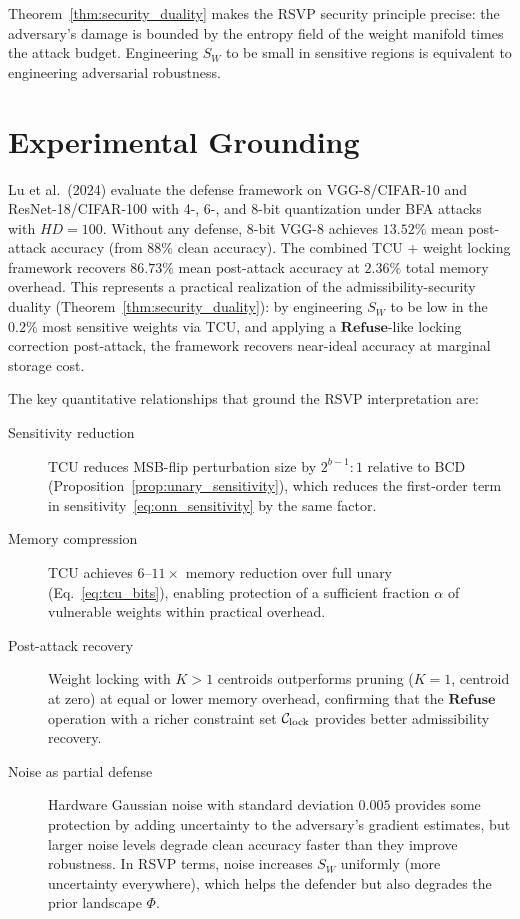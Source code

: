 \documentclass[11pt, openright, twoside]{book}
\theoremstyle{plain}
\theoremstyle{definition}
\theoremstyle{remark}
\newcommand{\Sfield}{S}
\newcommand{\Refuse}{\mathbf{Refuse}}
\begin{document}
Theorem~\ref{thm:security_duality} makes the RSVP security principle precise: the
adversary's damage is bounded by the entropy field of the weight manifold times the
attack budget. Engineering $\Sfield_W$ to be small in sensitive regions is equivalent
to engineering adversarial robustness.

\section{Experimental Grounding}

Lu et al.\ (2024) evaluate the defense framework on VGG-8/CIFAR-10 and ResNet-18/CIFAR-100
with 4-, 6-, and 8-bit quantization under BFA attacks with $HD=100$. Without any defense,
8-bit VGG-8 achieves $13.52\%$ mean post-attack accuracy (from $88\%$ clean accuracy).
The combined TCU + weight locking framework recovers $86.73\%$ mean post-attack accuracy
at $2.36\%$ total memory overhead. This represents a practical realization of the
admissibility-security duality (Theorem~\ref{thm:security_duality}): by engineering
$\Sfield_W$ to be low in the $0.2\%$ most sensitive weights via TCU, and applying
a $\Refuse$-like locking correction post-attack, the framework recovers near-ideal
accuracy at marginal storage cost.

The key quantitative relationships that ground the RSVP interpretation are:

\begin{description}
\item[Sensitivity reduction] TCU reduces MSB-flip perturbation size by $2^{b-1}:1$
  relative to BCD (Proposition~\ref{prop:unary_sensitivity}), which reduces the first-order
  term in sensitivity~\eqref{eq:onn_sensitivity} by the same factor.

\item[Memory compression] TCU achieves $6$--$11\times$ memory reduction over full unary
  (Eq.~\eqref{eq:tcu_bits}), enabling protection of a sufficient fraction $\alpha$
  of vulnerable weights within practical overhead.

\item[Post-attack recovery] Weight locking with $K>1$ centroids outperforms pruning
  ($K=1$, centroid at zero) at equal or lower memory overhead, confirming that
  the $\Refuse$ operation with a richer constraint set $\mathcal{C}_{\rm lock}$
  provides better admissibility recovery.

\item[Noise as partial defense] Hardware Gaussian noise with standard deviation $0.005$
  provides some protection by adding uncertainty to the adversary's gradient estimates,
  but larger noise levels degrade clean accuracy faster than they improve robustness.
  In RSVP terms, noise increases $\Sfield_W$ uniformly (more uncertainty everywhere),
  which helps the defender but also degrades the prior landscape $\Phi$.
\end{description}
\end{document}
